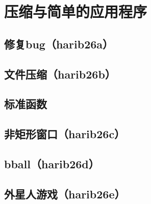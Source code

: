 ﻿\chapter{	压缩与简单的应用程序	}
\section{	修复bug（harib26a）	}
\section{	文件压缩（harib26b）	}
\section{	标准函数	}
\section{	非矩形窗口（harib26c）	}
\section{	bball（harib26d）	}
\section{	外星人游戏（harib26e）	}

